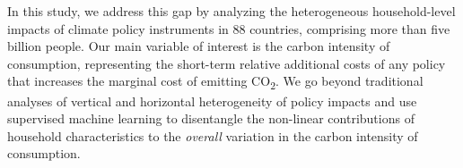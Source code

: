 \documentclass[12pt, a4paper]{article}
\begin{document}


In this study, we address this gap by analyzing the heterogeneous household-level impacts of climate policy instruments in 88 countries, comprising more than five billion people. Our main variable of interest is the carbon intensity of consumption, representing the short-term relative additional costs of any policy that increases the marginal cost of emitting CO\textsubscript{2}. We go beyond traditional analyses of vertical and horizontal heterogeneity of policy impacts and use supervised machine learning to disentangle the non-linear contributions of household characteristics to the \textit{overall} variation in the carbon intensity of consumption.
\end{document}
